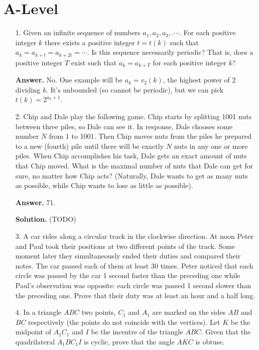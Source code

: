 \documentclass[11pt,a4paper]{article}
\begin{document}
\section*{A-Level}
\begin{enumerate}
	\item[1.] 
	Given an infinite sequence of numbers $a_1, a_2, a_3, .\cdots$.
	For each positive integer $k$ there exists a positive integer $t = t(k)$ such that 
	$a_k = a_{k+t} = a_{k+2t} = \cdots$. 
	Is this sequence necessarily periodic? 
	That is, does a positive integer $T$ exist such that $a_k = a_{k+T}$ for each positive
	integer $k$?
	
	\textbf{Answer.} No. 
	One example will be $a_k=v_2(k)$, 
	the highest power of 2 dividing $k$. 
	It's unbounded (so cannot be periodic), but we can pick $t(k)=2^{a_k+1}$. 
	
	\item [2.]
	Chip and Dale play the following game. Chip starts by splitting 1001 nuts between three
	piles, so Dale can see it. In response, Dale chooses some number $N$ from 1 to 1001. Then
	Chip moves nuts from the piles he prepared to a new (fourth) pile until there will be exactly
	$N$ nuts in any one or more piles. When Chip accomplishes his task, Dale gets an exact
	amount of nuts that Chip moved. What is the maximal number of nuts that Dale can get
	for sure, no matter how Chip acts? (Naturally, Dale wants to get as many nuts as possible,
	while Chip wants to lose as little as possible).
	
	\textbf{Answer.} 71. 
	
	\textbf{Solution.} (TODO)
	
	\item [3.] 
	A car rides along a circular track in the clockwise direction. At noon Peter and Paul took
	their positions at two different points of the track. Some moment later they simultaneously
	ended their duties and compared their notes. The car passed each of them at least 30 times.
	Peter noticed that each circle was passed by the car 1 second faster than the preceding
	one while Paul’s observation was opposite: each circle was passed 1 second slower than the
	preceding one.
	Prove that their duty was at least an hour and a half long.
	
	\item [4.] 
	In a triangle $ABC$ two points, $C_1$ and $A_1$ are marked on the sides $AB$ and $BC$ respectively
	(the points do not coincide with the vertices). 
	Let $K$ be the midpoint of $A_1C_1$ and $I$ be the incentre of the triangle $ABC$. 
	Given that the quadrilateral $A_1BC_1I$ is cyclic, prove that the angle $AKC$ is obtuse.
	

\end{enumerate}
\end{document}
